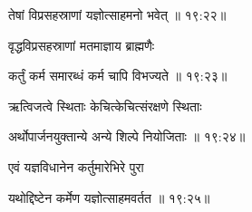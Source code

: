 
{\devanagarifont तेषां विप्रसहस्राणां यज्ञोत्साहमनो भवेत् {॥ १९:२२॥} \veg\dontdisplaylinenum }%

{\devanagarifont वृद्धविप्रसहस्राणां मतमाज्ञाय ब्राह्मणैः \thinspace{\dandab} \dontdisplaylinenum }%


{\devanagarifont कर्तुं कर्म समारब्धं कर्म चापि विभज्यते {॥ १९:२३॥} \veg\dontdisplaylinenum }%

{\devanagarifont ऋत्विजत्वे स्थिताः केचित्केचित्संरक्षणे स्थिताः \thinspace{\dandab} \dontdisplaylinenum }%


{\devanagarifont अर्थोपार्जनयुक्तान्ये अन्ये शिल्पे नियोजिताः {॥ १९:२४॥} \veg\dontdisplaylinenum }%

{\devanagarifont एवं यज्ञविधानेन कर्तुमारेभिरे पुरा \thinspace{\dandab} \dontdisplaylinenum }%


{\devanagarifont यथोद्दिष्टेन कर्मेण यज्ञोत्साहमवर्तत {॥ १९:२५॥} \veg\dontdisplaylinenum }%

